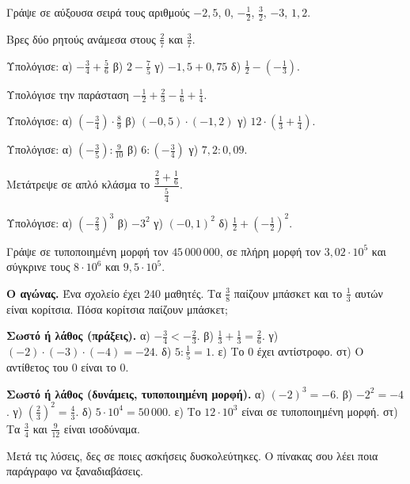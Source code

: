 \ex Γράψε σε αύξουσα σειρά τους αριθμούς $-2{,}5$, $0$, $-\frac{1}{2}$, $\frac{3}{2}$, $-3$, $1{,}2$.

\ex Βρες δύο ρητούς ανάμεσα στους $\frac{2}{7}$ και $\frac{3}{7}$.

\ex Υπολόγισε: α) $-\frac{3}{4}+\frac{5}{6}$ \quad β) $2-\frac{7}{5}$ \quad γ) $-1{,}5+0{,}75$ \quad δ) $\frac{1}{2}-\left(-\frac{1}{3}\right)$.

\ex Υπολόγισε την παράσταση $-\frac{1}{2}+\frac{2}{3}-\frac{1}{6}+\frac{1}{4}$.

\ex Υπολόγισε: α) $\left(-\frac{3}{4}\right)\cdot\frac{8}{9}$ \quad β) $(-0{,}5)\cdot(-1{,}2)$ \quad γ) $12\cdot\left(\frac{1}{3}+\frac{1}{4}\right)$.

\ex Υπολόγισε: α) $\left(-\frac{3}{5}\right):\frac{9}{10}$ \quad β) $6:\left(-\frac{3}{4}\right)$ \quad γ) $7{,}2:0{,}09$.

\ex Μετάτρεψε σε απλό κλάσμα το $\dfrac{\frac{2}{3}+\frac{1}{6}}{\frac{5}{4}}$.

\ex Υπολόγισε: α) $\left(-\frac{2}{3}\right)^3$ \quad β) $-3^2$ \quad γ) $(-0{,}1)^2$ \quad δ) $\frac{1}{2}+\left(-\frac{1}{2}\right)^2$.

\ex Γράψε σε τυποποιημένη μορφή τον $45\,000\,000$, σε πλήρη μορφή τον $3{,}02\cdot10^{5}$ και σύγκρινε τους $8\cdot10^{6}$ και $9{,}5\cdot10^{5}$.

\ex \textbf{Ο αγώνας.} Ένα σχολείο έχει $240$ μαθητές. Τα $\frac{3}{8}$ παίζουν μπάσκετ και το $\frac{1}{3}$ αυτών είναι κορίτσια. Πόσα κορίτσια παίζουν μπάσκετ;

\ex \textbf{Σωστό ή λάθος (πράξεις).} α) $-\frac{3}{4}<-\frac{2}{3}$. \quad β) $\frac{1}{3}+\frac{1}{3}=\frac{2}{6}$. \quad γ) $(-2)\cdot(-3)\cdot(-4)=-24$. \quad δ) $5:\frac{1}{5}=1$. \quad ε) Το $0$ έχει αντίστροφο. \quad στ) Ο αντίθετος του $0$ είναι το $0$.

\ex \textbf{Σωστό ή λάθος (δυνάμεις, τυποποιημένη μορφή).} α) $(-2)^3=-6$. \quad β) $-2^2=-4$. \quad γ) $\left(\frac{2}{3}\right)^2=\frac{4}{3}$. \quad δ) $5\cdot10^{4}=50\,000$. \quad ε) Το $12\cdot10^{3}$ είναι σε τυποποιημένη μορφή. \quad στ) Τα $\frac{3}{4}$ και $\frac{9}{12}$ είναι ισοδύναμα.


Μετά τις λύσεις, δες σε ποιες ασκήσεις δυσκολεύτηκες. Ο πίνακας σου λέει ποια παράγραφο να ξαναδιαβάσεις.

